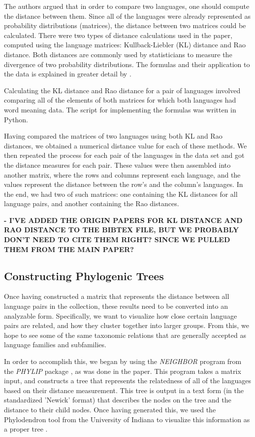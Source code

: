 \documentclass[10pt,a4]{article}
\begin{document}
The authors argued that in order to compare two languages, one should compute the distance between them. Since all of the languages were already represented as probability distributions (matrices), the distance between two matrices could be calculated. There were two types of distance calculations used in the paper, computed using the language matrices: Kullback-Liebler (KL) distance and Rao distance. Both distances are commonly used by statisticians to measure the divergence of two probability distributions.  The formulas and their application to the data is explained in greater detail by .

Calculating the KL distance and Rao distance for a pair of languages involved comparing all of the elements of both matrices for which both languages had word meaning data. The script for implementing the formulas was written in Python. 

Having compared the matrices of two languages using both KL and Rao distances, we obtained a numerical distance value for each of these methods. We then repeated the process for each pair of the languages in the data set and got the distance measures for each pair. These values were then assembled into another matrix, where the rows and columns represent each language, and the values represent the distance between the row's and the column's languages. In the end, we had two of such matrices: one containing the KL distances for all language pairs, and another containing the Rao distances.

\textbf{- I'VE ADDED THE ORIGIN PAPERS FOR KL DISTANCE AND RAO DISTANCE TO THE BIBTEX FILE, BUT WE PROBABLY DON'T NEED TO CITE THEM RIGHT?  SINCE WE PULLED THEM FROM THE MAIN PAPER?}

\subsection{Constructing Phylogenic Trees}

Once having constructed a matrix that represents the distance between all language pairs in the collection, these results need to be converted into an analyzable form.  Specifically, we want to visualize how close certain language pairs are related, and how they cluster together into larger groups.  From this, we hope to see some of the same taxonomic relations that are generally accepted as language families and subfamilies.

In order to accomplish this, we began by using the \textit{NEIGHBOR} program from the \textit{PHYLIP} package \cite{web:phylip}, as was done in the paper.  This program takes a matrix input, and constructs a tree that represents the relatedness of all of the languages based on their distance measurement.  This tree is output in a text form (in the standardized 'Newick' format) that describes the nodes on the tree and the distance to their child nodes.  Once having generated this, we used the Phylodendron tool from the University of Indiana to visualize this information as a proper tree \cite{web:phylodendron}.  
\end{document}
